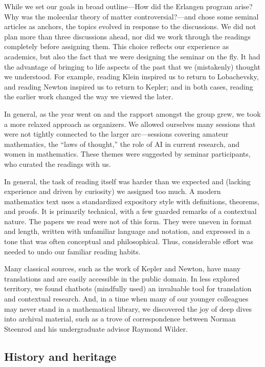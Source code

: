 \documentclass{article}
\begin{document}
While we set our goals in broad outline—How did the Erlangen program arise? Why was the molecular theory of matter controversial?—and chose some seminal articles as anchors, the topics evolved in response to the discussions. We did not plan more than three discussions ahead, nor did we work through the readings completely before assigning them. This choice reflects our experience as academics, but also the fact that we were designing the seminar on the fly. It had the advantage of bringing to life aspects of the past that we (mistakenly) thought we understood. For example, reading Klein inspired us to return to Lobachevsky, and reading Newton inspired us to return to Kepler; and in both cases, reading the earlier work changed the way we viewed the later.

In general, as the year went on and the rapport amongst the group grew, we took a more relaxed approach as organizers. We allowed ourselves many sessions that were not tightly connected to the larger arc—sessions covering amateur mathematics, the “laws of thought,” the role of AI in current research, and  women in mathematics. These themes were suggested by seminar participants, who curated the readings with us.

In general, the task of reading itself was harder than we expected and (lacking experience and driven by curiosity) we assigned too much. A modern mathematics text uses a standardized expository style with definitions, theorems, and proofs. It is primarily technical, with a few guarded remarks of a contextual nature. The papers we read were not of this form. They were uneven in format and length, written with unfamiliar language and notation, and expressed in a tone that was often conceptual and philosophical. Thus, considerable effort was needed to undo our familiar reading habits.

Many classical sources, such as the work of Kepler and Newton, have many translations and are easily accessible in the public domain. In less explored territory, we found chatbots (mindfully used)  an invaluable tool for translation and contextual research. And, in a time when many of our younger colleagues may never stand in a mathematical library, we discovered the joy of deep dives into archival material, such as a trove of correspondence between Norman Steenrod and his undergraduate advisor Raymond Wilder.
%

 
\subsection{History and heritage}
\end{document}
